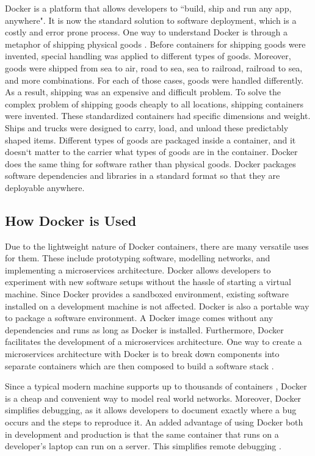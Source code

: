 \documentclass[11pt]{article}
\begin{document}
Docker is a platform that allows developers to ``build, ship and run any app, anywhere". It is now the standard solution to software deployment, which is a costly and error prone process. One way to understand Docker is through a metaphor of shipping physical goods \cite{miell}. Before containers for shipping goods were invented, special handling was applied to different types of goods. Moreover, goods were shipped from sea to air, road to sea, sea to railroad, railroad to sea, and more combinations. For each of those cases, goods were handled differently. As a result, shipping was an expensive and difficult problem. To solve the complex problem of shipping goods cheaply to all locations, shipping containers were invented. These standardized containers had specific dimensions and weight. Ships and trucks were designed to carry, load, and unload these predictably shaped items. Different types of goods are packaged inside a container, and it doesn`t matter to the carrier what types of goods are in the container. Docker does the same thing for software rather than physical goods. Docker packages software dependencies and libraries in a standard format so that they are deployable anywhere.

\subsection{How Docker is Used}
Due to the lightweight nature of Docker containers, there are many versatile uses for them. These include prototyping software, modelling networks, and implementing a microservices architecture. Docker allows developers to experiment with new software setups without the hassle of starting a virtual machine. Since Docker provides a sandboxed environment, existing software installed on a development machine is not affected. Docker is also a portable way to package a software environment. A Docker image comes without any dependencies and runs as long as Docker is installed. Furthermore, Docker facilitates the development of a microservices architecture. One way to create a microservices architecture with Docker is to break down components into separate containers which are then composed to build a software stack \cite{miell}.

Since a typical modern machine supports up to thousands of containers \cite{pahl}, Docker is a cheap and convenient way to model real world networks. Moreover, Docker simplifies debugging, as it allows developers to document exactly where a bug occurs and the steps to reproduce it. An added advantage of using Docker both in development and production is that the same container that runs on a developer’s laptop can run on a server. This simplifies remote debugging \cite{miell}.
\end{document}
